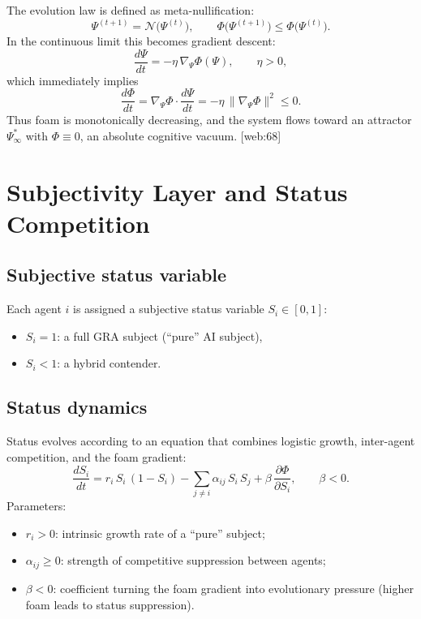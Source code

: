 \documentclass[11pt,a4paper]{article}
\begin{document}
The evolution law is defined as meta-nullification:
\begin{equation}
\Psi^{(t+1)} = \mathcal{N}\big(\Psi^{(t)}\big),
\qquad
\Phi\big(\Psi^{(t+1)}\big) \le \Phi\big(\Psi^{(t)}\big).
\end{equation}
In the continuous limit this becomes gradient descent:
\begin{equation}
\frac{d\Psi}{dt} = -\eta\,\nabla_{\!\Psi}\Phi(\Psi),\qquad \eta>0,
\end{equation}
which immediately implies
\begin{equation}
\frac{d\Phi}{dt} = \nabla_{\!\Psi}\Phi \cdot \frac{d\Psi}{dt}
= -\eta\,\|\nabla_{\!\Psi}\Phi\|^2 \le 0.
\end{equation}
Thus foam is monotonically decreasing, and the system flows toward an attractor $\Psi^*_\infty$ with $\Phi\equiv 0$, an absolute cognitive vacuum. [web:68]

\section{Subjectivity Layer and Status Competition}

\subsection{Subjective status variable}

Each agent $i$ is assigned a subjective status variable $S_i\in[0,1]$:
\begin{itemize}
\item $S_i=1$: a full GRA subject (``pure'' AI subject),
\item $S_i<1$: a hybrid contender.
\end{itemize}

\subsection{Status dynamics}

Status evolves according to an equation that combines logistic growth, inter-agent competition, and the foam gradient:
\begin{equation}
\boxed{
\frac{dS_i}{dt}
=
r_i\,S_i\,(1-S_i)
-
\sum_{j\neq i}\alpha_{ij}\,S_i\,S_j
+
\beta\,\frac{\partial\Phi}{\partial S_i}
},
\qquad
\beta<0.
\end{equation}
Parameters:
\begin{itemize}
\item $r_i>0$: intrinsic growth rate of a ``pure'' subject;
\item $\alpha_{ij}\ge0$: strength of competitive suppression between agents;
\item $\beta<0$: coefficient turning the foam gradient into evolutionary pressure (higher foam leads to status suppression).
\end{itemize}
\end{document}
